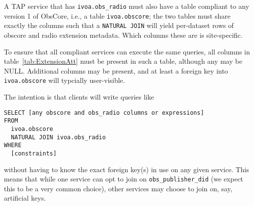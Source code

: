 \documentclass[11pt,a4paper]{ivoa}
\begin{document}
A TAP service that has \verb|ivoa.obs_radio| must also have a table
compliant to any version 1 of ObsCore, i.e., a table
\verb|ivoa.obscore|; the two tables must share exactly the columns such
that a \verb|NATURAL JOIN| will yield per-dataset rows of obscore and
radio extension metadata.  Which columns these are is site-specific.

To ensure that all compliant services can execute the same queries,
all columns in table~\ref{tab:ExtensionAtt} must be present in such a
table, although any may be NULL.  Additional columns may be present, and
at least a foreign key into \verb|ivoa.obscore| will typcially
user-visible.

The intention is that clients will write queries like
\begin{lstlisting}
SELECT [any obscore and obs_radio columns or expressions]
FROM
  ivoa.obscore
  NATURAL JOIN ivoa.obs_radio
WHERE
  [constraints]
\end{lstlisting}
without having to know the exact foreign key(s) in use on any given
service.  This means that while one service can opt to join on
\verb|obs_publisher_did| (we expect this to be a very common choice),
other services may choose to join on, say, artificial keys.
\end{document}

